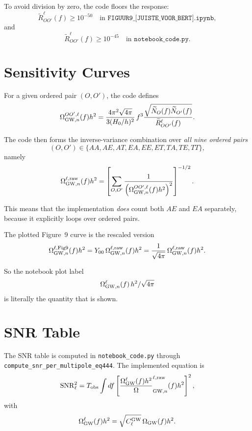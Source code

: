 \documentclass[11pt]{article}
\begin{document}
To avoid division by zero, the code floors the response:
\begin{equation}
\widetilde R_{OO'}^\ell(f) \ge 10^{-50}
\quad \text{in } \texttt{FIGUUR9\_[JUISTE\_VOOR\_BERT].ipynb},
\end{equation}
and
\begin{equation}
\widetilde R_{OO'}^\ell(f) \ge 10^{-45}
\quad \text{in } \texttt{notebook\_code.py}.
\end{equation}

\section{Sensitivity Curves}
For a given ordered pair $(O,O')$, the code defines
\begin{equation}
\Omega_{{\rm GW},n}^{OO',\ell}(f) h^2
=
\frac{4\pi^2\sqrt{4\pi}}{3(H_0/h)^2}\,
f^3
\frac{\sqrt{\widetilde N_O(f)\widetilde N_{O'}(f)}}{\widetilde R_{OO'}^\ell(f)}.
\end{equation}

The code then forms the inverse-variance combination over \emph{all nine ordered pairs}
\begin{equation}
(O,O') \in \{AA,AE,AT,EA,EE,ET,TA,TE,TT\},
\end{equation}
namely
\begin{equation}
\Omega_{{\rm GW},n}^{\ell,{\rm raw}}(f) h^2
=
\left[
\sum_{O,O'}
\frac{1}{\left(\Omega_{{\rm GW},n}^{OO',\ell}(f) h^2\right)^2}
\right]^{-1/2}.
\end{equation}

This means that the implementation \emph{does} count both $AE$ and $EA$ separately, because it explicitly loops over ordered pairs.

The plotted Figure~9 curve is the rescaled version
\begin{equation}
\Omega_{{\rm GW},n}^{\ell,{\rm Fig9}}(f) h^2
=
Y_{00}\,
\Omega_{{\rm GW},n}^{\ell,{\rm raw}}(f) h^2
=
\frac{1}{\sqrt{4\pi}}\,
\Omega_{{\rm GW},n}^{\ell,{\rm raw}}(f) h^2.
\end{equation}

So the notebook plot label
\begin{equation}
\Omega_{{\rm GW},n}^{\ell}(f)\,h^2/\sqrt{4\pi}
\end{equation}
is literally the quantity that is shown.

\section{SNR Table}
The SNR table is computed in \texttt{notebook\_code.py} through \texttt{compute\_snr\_per\_multipole\_eq444}. The implemented equation is
\begin{equation}
{\rm SNR}_\ell^2
=
T_{\rm obs}
\int df
\left[
\frac{\Omega_{\rm GW}^{\ell}(f) h^2}
\Omega_{{\rm GW},n}^{\ell,{\rm raw}}(f) h^2
\right]^2,
\end{equation}
with
\begin{equation}
\Omega_{\rm GW}^{\ell}(f) h^2
=
\sqrt{C_\ell^{\rm GW}}\,
\Omega_{\rm GW}(f) h^2.
\end{equation}
\end{document}
